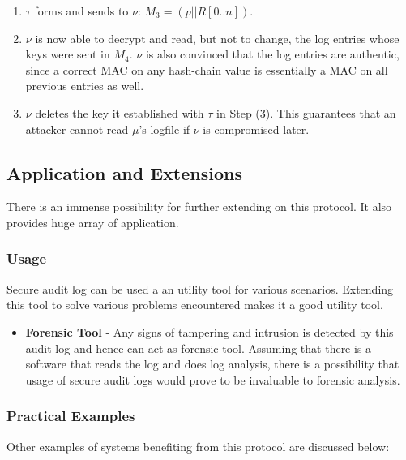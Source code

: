 \documentclass[12pt, letter]{article}
\begin{document}
\begin{enumerate}
    \item $\tau$ forms and sends to $\nu$: $M_3 = (p|| R[0..n])$.
    
    \item $\nu$ is now able to decrypt and read, but not to change, the log entries whose keys were sent in $M_4$. $\nu$ is also convinced that the log entries are authentic, since a correct MAC on any hash-chain value is essentially a MAC on all previous entries as well.
    
    \item $\nu$ deletes the key it established with $\tau$ in Step (3). This guarantees that an attacker cannot read $\mu$'s logfile if $\nu$ is compromised later. 

\end{enumerate}



\subsection{Application and Extensions}
\label{sec:application}

There is an immense possibility for further extending on this protocol. It also provides huge array of application.

\subsubsection{Usage}

Secure audit log can be used a an utility tool for various scenarios. Extending this tool to solve various problems encountered makes it a good utility tool.

\begin{itemize}
    \item \textbf{Forensic Tool} - Any signs of tampering and intrusion is detected by this audit log and hence can act as forensic tool. Assuming that there is a software that reads the log and does log analysis, there is a possibility that usage of secure audit logs would prove to be invaluable to forensic analysis.
\end{itemize}

\subsubsection{Practical Examples}

Other examples of systems benefiting from this protocol are discussed below:\\
\end{document}
